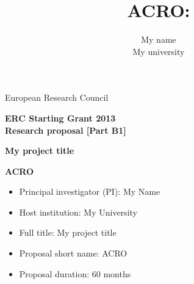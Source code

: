 \documentclass[oneside, a4paper, onecolumn, 11pt]{article}
\title{ACRO:\\ }
\author{My name\\ My university}
\begin{document}
\noindent
European Research Council

\vfill

\begin{center}
\large{\textbf{ERC Starting Grant 2013\\
Research proposal [Part B1] }
}
\vfill

\LARGE{\textbf{My project title}}

\vfill

\LARGE{\textbf{ACRO}}

\vfill

\end{center}

\vfill

\begin{itemize}
\item Principal investigator (PI): My Name
\item Host institution: My University
\item Full title: My project title
\item Proposal short name: ACRO
\item Proposal duration: 60 months
\end{itemize}
	

\vfill
\end{document}

